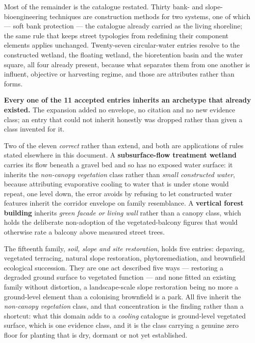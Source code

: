 Most of the remainder is the catalogue restated. Thirty bank- and
slope-bioengineering techniques are construction methods for two systems, one of
which --- soft bank protection --- the catalogue already carried as the living
shoreline; the same rule that keeps street typologies from redefining their
component elements applies unchanged. Twenty-seven circular-water entries
resolve to the constructed wetland, the floating wetland, the bioretention basin
and the water square, all four already present, because what separates them from
one another is influent, objective or harvesting regime, and those are
attributes rather than forms.

\begin{keynote}
\noindent\textbf{Every one of the \num{11} accepted entries inherits an
archetype that already existed.} The expansion added no envelope, no citation
and no new evidence class; an entry that could not inherit honestly was dropped
rather than given a class invented for it.
\end{keynote}

Two of the eleven \emph{correct} rather than extend, and both are applications
of rules stated elsewhere in this document. A \textbf{subsurface-flow treatment
wetland} carries its flow beneath a gravel bed and so has no exposed water
surface: it inherits the \emph{non-canopy vegetation} class rather than
\emph{small constructed water}, because attributing evaporative cooling to
water that is under stone would repeat, one level down, the error
 avoids by refusing to let constructed water features
inherit the corridor envelope on family resemblance. A \textbf{vertical forest
building} inherits \emph{green facade or living wall} rather than a canopy
class, which holds the deliberate non-adoption of the vegetated-balcony figures
that would otherwise rate a balcony above measured street trees.

The fifteenth family, \emph{soil, slope and site restoration}, holds five
entries: depaving, vegetated terracing, natural slope restoration,
phytoremediation, and brownfield ecological succession. They are one act
described five ways --- restoring a degraded ground surface to vegetated
function --- and none fitted an existing family without distortion, a
landscape-scale slope restoration being no more a ground-level element than a
colonising brownfield is a park. All five inherit the
\emph{non-canopy vegetation} class, and that concentration is the finding
rather than a shortcut: what this domain adds to a \emph{cooling} catalogue is
ground-level vegetated surface, which is one evidence class, and it is the class
carrying a genuine zero floor for planting that is dry, dormant or not yet
established.

